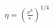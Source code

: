 \documentclass[preview]{standalone}
\begin{document}
\begin{align*}
\eta = \left(\frac{\nu^3}{\epsilon}\right)^{1/4}
\end{align*}
\end{document}
